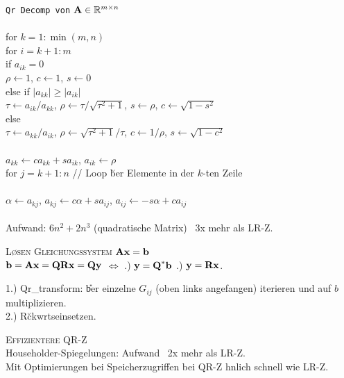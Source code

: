 \verb!Qr Decomp von! $\mbox{\bf A} \in \mathbb{R}^{m \times n}$\\
{\addtolength{\leftskip}{0mm}
\hrulefill\\
for $k=1:\min(m,n)$ \\
\quad for $i=k+1:m$ \\
\qquad if $a_{ik}=0$\\
\qquad\quad $\rho \leftarrow 1$, $c \leftarrow 1$, $s \leftarrow 0$ \\
\qquad else if $|a_{kk}|\geq|a_{ik}|$ \\
\qquad\quad $\tau \leftarrow a_{ik}/a_{kk}$, $\rho \leftarrow \tau/\sqrt{\tau^2+1}$, $s \leftarrow \rho$, $c\leftarrow \sqrt{1-s^2}$ \\
\qquad else \qquad\qquad\qquad\quad{} \\
\qquad\quad $\tau \leftarrow a_{kk}/a_{ik}$, $\rho \leftarrow \sqrt{\tau^2+1}/\tau$, $c \leftarrow 1/\rho$, $s\leftarrow \sqrt{1-c^2}$ \\
\\ 
\qquad $a_{kk} \leftarrow ca_{kk}+sa_{ik}$, $a_{ik}\leftarrow \rho$\\
\qquad for $j=k+1:n$ {\scriptsize // Loop \u ber Elemente in der $k$-ten Zeile}\\
\qquad {} \\
\qquad \quad $\alpha \leftarrow a_{kj}$, $a_{kj} \leftarrow c\alpha+sa_{ij}$, $a_{ij} \leftarrow -s\alpha + ca_{ij}$ \\
\hrulefill\\
}
Aufwand: $6n^2+2n^3$ (quadratische Matrix) ~3x mehr als LR-Z. \vspace{0.2cm}

\textsc{L\o sen Gleichungssystem $\mbox{\bf Ax}=\mbox{\bf b}$}\\
$\mbox{\bf b}=\mbox{\bf Ax}=\mbox{\bf QRx}=\mbox{\bf Qy}$ \quad $\Leftrightarrow$ .) $\mbox{\bf y}=\mbox{\bf Q}^*\mbox{\bf b}$ .) $\mbox{\bf y}=\mbox{\bf Rx}$.

1.) Qr\_transform: \U ber einzelne $G_{ij}$ (oben links angefangen) iterieren und auf $b$ multiplizieren. \\
2.) R\u ckw\a rtseinsetzen.\vspace{0.2cm}

\textsc{Effizientere QR-Z}\\
Householder-Spiegelungen: Aufwand ~2x mehr als LR-Z.\\
Mit Optimierungen bei Speicherzugriffen bei QR-Z \a hnlich schnell wie LR-Z.\vspace{0.2cm}

